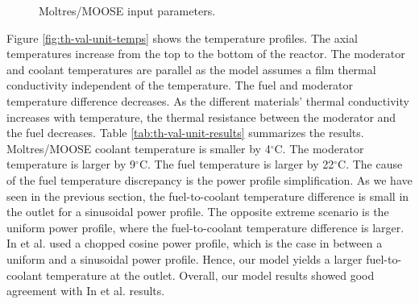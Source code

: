 \begin{figure}[htbp!]
	\centering
	\hfill
  \caption{Moltres/MOOSE input parameters.}
	\label{fig:th-val-unit-model}
\end{figure}

Figure \ref{fig:th-val-unit-temps} shows the temperature profiles.
The axial temperatures increase from the top to the bottom of the reactor.
The moderator and coolant temperatures are parallel as the model assumes a film thermal conductivity independent of the temperature.
The fuel and moderator temperature difference decreases.
As the different materials' thermal conductivity increases with temperature, the thermal resistance between the moderator and the fuel decreases.
Table \ref{tab:th-val-unit-results} summarizes the results.
Moltres/MOOSE coolant temperature is smaller by 4$^{\circ}$C.
The moderator temperature is larger by 9$^{\circ}$C.
The fuel temperature is larger by 22$^{\circ}$C.
The cause of the fuel temperature discrepancy is the power profile simplification.
As we have seen in the previous section, the fuel-to-coolant temperature difference is small in the outlet for a sinusoidal power profile. 
The opposite extreme scenario is the uniform power profile, where the fuel-to-coolant temperature difference is larger.
In et al. used a chopped cosine power profile, which is the case in between a uniform and a sinusoidal power profile.
Hence, our model yields a larger fuel-to-coolant temperature at the outlet.
Overall, our model results showed good agreement with In et al. results.

